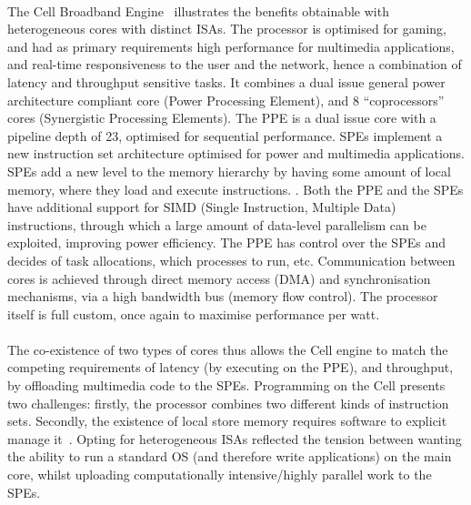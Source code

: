 \paragraph{} The Cell Broadband Engine~\cite{kahle2005cell} illustrates the benefits obtainable with heterogeneous
cores with distinct ISAs. The processor is optimised for gaming, and had as primary 
requirements high performance for multimedia applications, and real-time
responsiveness to the user and the network, hence a combination of 
latency and throughput sensitive tasks. It combines a dual 
issue general power architecture compliant core 
(Power Processing Element), and 8 ``coprocessors''
cores (Synergistic Processing Elements).  The PPE is a dual issue core with a 
pipeline depth of 23, optimised for sequential performance. SPEs implement a new instruction set architecture optimised for power and multimedia applications.
SPEs add a new level to the memory hierarchy by having some amount of local memory, where they load and execute instructions. . Both the PPE and the SPEs have
additional support for SIMD (Single Instruction, Multiple Data) instructions, through which a large amount of data-level parallelism can be exploited, improving power efficiency. The PPE has control over the SPEs and decides of task allocations, which processes to run, etc. Communication between cores is achieved 
through direct memory access (DMA) and synchronisation mechanisms, via a high bandwidth bus (memory flow control). The processor itself is full 
custom, once again to maximise performance per watt. 

\paragraph{} The co-existence of two types of cores thus allows the Cell engine to match
the competing requirements of latency (by executing on the PPE),
and throughput, by offloading multimedia code to the SPEs. 
Programming on the Cell presents two challenges: firstly, the processor
combines two different kinds of instruction sets. Secondly, the existence of 
local store memory requires software to explicit manage it~\cite{kahle2005cell}.  Opting for heterogeneous ISAs reflected the tension between wanting 
the ability to run a standard OS (and therefore write applications) on the main core, whilst uploading computationally intensive/highly parallel work to the SPEs.

